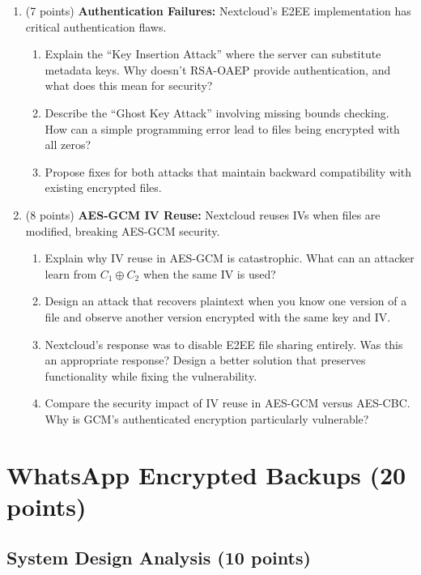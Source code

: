 \documentclass[10pt,a4paper,american]{exam}
\begin{document}
\begin{enumerate}
	\item (7 points) \textbf{Authentication Failures:}
	      Nextcloud's E2EE implementation has critical authentication flaws.
	      \begin{enumerate}
		      \item Explain the ``Key Insertion Attack'' where the server can substitute metadata keys. Why doesn't RSA-OAEP provide authentication, and what does this mean for security?
		      \item Describe the ``Ghost Key Attack'' involving missing bounds checking. How can a simple programming error lead to files being encrypted with all zeros?
		      \item Propose fixes for both attacks that maintain backward compatibility with existing encrypted files.
	      \end{enumerate}
	\item (8 points) \textbf{AES-GCM IV Reuse:}
	      Nextcloud reuses IVs when files are modified, breaking AES-GCM security.
	      \begin{enumerate}
		      \item Explain why IV reuse in AES-GCM is catastrophic. What can an attacker learn from $C_1 \oplus C_2$ when the same IV is used?
		      \item Design an attack that recovers plaintext when you know one version of a file and observe another version encrypted with the same key and IV.
		      \item Nextcloud's response was to disable E2EE file sharing entirely. Was this an appropriate response? Design a better solution that preserves functionality while fixing the vulnerability.
		      \item Compare the security impact of IV reuse in AES-GCM versus AES-CBC. Why is GCM's authenticated encryption particularly vulnerable?
	      \end{enumerate}
\end{enumerate}

\section{WhatsApp Encrypted Backups (20 points)}

\subsection{System Design Analysis (10 points)}
\end{document}
